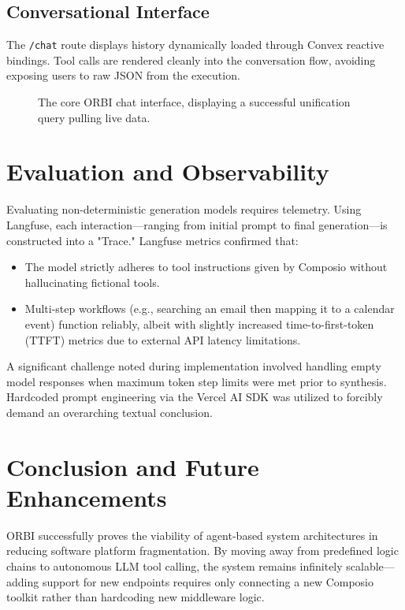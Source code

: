 \documentclass[12pt,a4paper]{article}
\begin{document}
\subsection{Conversational Interface}
The \texttt{/chat} route displays history dynamically loaded through Convex reactive bindings. Tool calls are rendered cleanly into the conversation flow, avoiding exposing users to raw JSON from the execution. 

\begin{figure}[H]
    \centering
    \vspace{6cm} %
    \caption{The core ORBI chat interface, displaying a successful unification query pulling live data.}
    \label{fig:chat}
\end{figure}

\section{Evaluation and Observability}
\label{sec:evaluation}
Evaluating non-deterministic generation models requires telemetry. Using Langfuse, each interaction—ranging from initial prompt to final generation—is constructed into a "Trace." Langfuse metrics confirmed that:
\begin{itemize}
    \item The model strictly adheres to tool instructions given by Composio without hallucinating fictional tools.
    \item Multi-step workflows (e.g., searching an email then mapping it to a calendar event) function reliably, albeit with slightly increased time-to-first-token (TTFT) metrics due to external API latency limitations.
\end{itemize}
A significant challenge noted during implementation involved handling empty model responses when maximum token step limits were met prior to synthesis. Hardcoded prompt engineering via the Vercel AI SDK was utilized to forcibly demand an overarching textual conclusion.

\section{Conclusion and Future Enhancements}
\label{sec:conclusion}
ORBI successfully proves the viability of agent-based system architectures in reducing software platform fragmentation. By moving away from predefined logic chains to autonomous LLM tool calling, the system remains infinitely scalable—adding support for new endpoints requires only connecting a new Composio toolkit rather than hardcoding new middleware logic.
\end{document}
